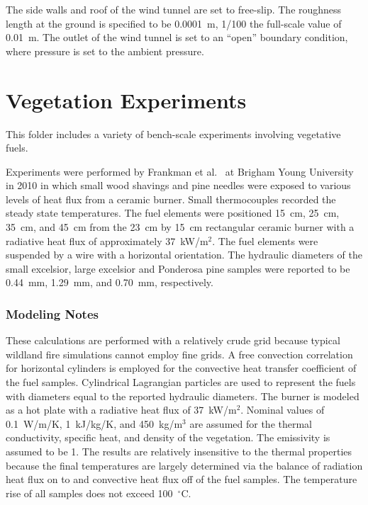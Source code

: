 The side walls and roof of the wind tunnel are set to free-slip. The roughness length at the ground is specified to be 0.0001~m, 1/100 the full-scale value of 0.01~m. The outlet of the wind tunnel is set to an ``open'' boundary condition, where pressure is set to the ambient pressure.


\section{Vegetation Experiments}
\label{Vegetation_Description}

This folder includes a variety of bench-scale experiments involving vegetative fuels.

Experiments were performed by Frankman et al.~\cite{Frankman:CST2010} at Brigham Young University in 2010 in which small wood shavings and pine needles were exposed to various levels of heat flux from a ceramic burner. Small thermocouples recorded the steady state temperatures. The fuel elements were positioned 15~cm, 25~cm, 35~cm, and 45~cm from the 23~cm by 15~cm rectangular ceramic burner with a radiative heat flux of approximately 37~kW/m$^2$. The fuel elements were suspended by a wire with a horizontal orientation. The hydraulic diameters of the small excelsior, large excelsior and Ponderosa pine samples were reported to be 0.44~mm, 1.29~mm, and 0.70~mm, respectively.

\subsubsection{Modeling Notes}

These calculations are performed with a relatively crude grid because typical wildland fire simulations cannot employ fine grids. A free convection correlation for horizontal cylinders is employed for the convective heat transfer coefficient of the fuel samples. Cylindrical Lagrangian particles are used to represent the fuels with diameters equal to the reported hydraulic diameters. The burner is modeled as a hot plate with a radiative heat flux of 37~kW/m$^2$. Nominal values of 0.1~W/m/K, 1~kJ/kg/K, and 450~kg/m$^3$ are assumed for the thermal conductivity, specific heat, and density of the vegetation. The emissivity is assumed to be 1. The results are relatively insensitive to the thermal properties because the final temperatures are largely determined via the balance of radiation heat flux on to and convective heat flux off of the fuel samples. The temperature rise of all samples does not exceed 100~$^\circ$C.




